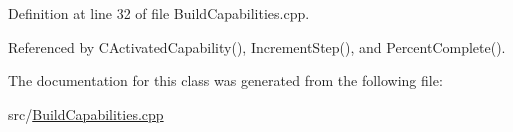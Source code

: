 Definition at line 32 of file Build\+Capabilities.\+cpp.



Referenced by C\+Activated\+Capability(), Increment\+Step(), and Percent\+Complete().



The documentation for this class was generated from the following file\+:\begin{DoxyCompactItemize}
\item 
src/\hyperlink{BuildCapabilities_8cpp}{Build\+Capabilities.\+cpp}\end{DoxyCompactItemize}
